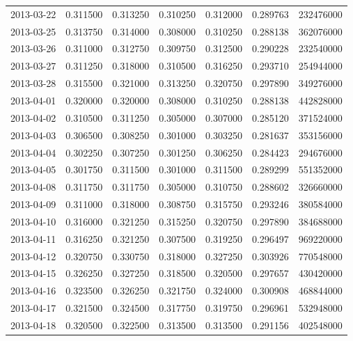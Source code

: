 \begin{tabular}{lrrrrrr}
2013-03-22 &    0.311500 &    0.313250 &    0.310250 &    0.312000 &    0.289763 &   232476000 \\
2013-03-25 &    0.313750 &    0.314000 &    0.308000 &    0.310250 &    0.288138 &   362076000 \\
2013-03-26 &    0.311000 &    0.312750 &    0.309750 &    0.312500 &    0.290228 &   232540000 \\
2013-03-27 &    0.311250 &    0.318000 &    0.310500 &    0.316250 &    0.293710 &   254944000 \\
2013-03-28 &    0.315500 &    0.321000 &    0.313250 &    0.320750 &    0.297890 &   349276000 \\
2013-04-01 &    0.320000 &    0.320000 &    0.308000 &    0.310250 &    0.288138 &   442828000 \\
2013-04-02 &    0.310500 &    0.311250 &    0.305000 &    0.307000 &    0.285120 &   371524000 \\
2013-04-03 &    0.306500 &    0.308250 &    0.301000 &    0.303250 &    0.281637 &   353156000 \\
2013-04-04 &    0.302250 &    0.307250 &    0.301250 &    0.306250 &    0.284423 &   294676000 \\
2013-04-05 &    0.301750 &    0.311500 &    0.301000 &    0.311500 &    0.289299 &   551352000 \\
2013-04-08 &    0.311750 &    0.311750 &    0.305000 &    0.310750 &    0.288602 &   326660000 \\
2013-04-09 &    0.311000 &    0.318000 &    0.308750 &    0.315750 &    0.293246 &   380584000 \\
2013-04-10 &    0.316000 &    0.321250 &    0.315250 &    0.320750 &    0.297890 &   384688000 \\
2013-04-11 &    0.316250 &    0.321250 &    0.307500 &    0.319250 &    0.296497 &   969220000 \\
2013-04-12 &    0.320750 &    0.330750 &    0.318000 &    0.327250 &    0.303926 &   770548000 \\
2013-04-15 &    0.326250 &    0.327250 &    0.318500 &    0.320500 &    0.297657 &   430420000 \\
2013-04-16 &    0.323500 &    0.326250 &    0.321750 &    0.324000 &    0.300908 &   468844000 \\
2013-04-17 &    0.321500 &    0.324500 &    0.317750 &    0.319750 &    0.296961 &   532948000 \\
2013-04-18 &    0.320500 &    0.322500 &    0.313500 &    0.313500 &    0.291156 &   402548000 \\

\end{tabular}
